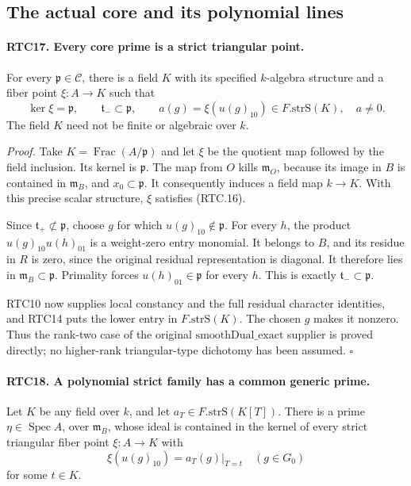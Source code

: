 \subsection{The actual core and its polynomial lines}

\paragraph{RTC17. Every core prime is a strict triangular point.}
\label{claim:RTC17}
For every \(\mathfrak p\in\mathcal C\), there is a field
\(K\) with its specified \(k\)-algebra structure and a fiber
point \(\xi:A\to K\) such that
\[
 \ker\xi=\mathfrak p,\qquad
 \mathfrak t_-\subset\mathfrak p,\qquad
 a(g)=\xi(u(g)_{10})\in F.\mathrm{strS}(K),\quad a\ne0.
                                                        \tag{RTC.29}
\]
The field \(K\) need not be finite or algebraic over \(k\).

\emph{Proof.}
Take \(K=\operatorname{Frac}(A/\mathfrak p)\) and let
\(\xi\) be the quotient map followed by the field inclusion.
Its kernel is \(\mathfrak p\).  The map from \(O\) kills
\(\mathfrak m_O\), because its image in \(B\) is contained
in \(\mathfrak m_B\), and \(x_0\subset\mathfrak p\).
It consequently induces a field map \(k\to K\).  With this
precise scalar structure, \(\xi\) satisfies (RTC.16).

Since \(\mathfrak t_+\not\subset\mathfrak p\), choose
\(g\) for which \(u(g)_{10}\notin\mathfrak p\).
For every \(h\), the product
\(u(g)_{10}u(h)_{01}\) is a weight-zero entry monomial.
It belongs to \(B\), and its residue in \(R\) is zero,
since the original residual representation is diagonal.
It therefore lies in \(\mathfrak m_B\subset\mathfrak p\).
Primality forces \(u(h)_{01}\in\mathfrak p\) for every
\(h\).  This is exactly \(\mathfrak t_-\subset\mathfrak p\).

RTC10 now supplies local constancy and the full residual character
identities, and RTC14 puts the lower entry in
\(F.\mathrm{strS}(K)\).  The chosen \(g\) makes it nonzero.
Thus the rank-two case of the original
\(\mathrm{smoothDual\_exact}\) supplier is proved directly;
no higher-rank triangular-type dichotomy has been assumed.
\hfill\(\square\)

\paragraph{RTC18. A polynomial strict family has a common generic prime.}
\label{claim:RTC18}
Let \(K\) be any field over \(k\), and let
\(a_T\in F.\mathrm{strS}(K[T])\).  There is a prime
\(\eta\in\operatorname{Spec}A\), over \(\mathfrak m_B\),
whose ideal is contained in the kernel of every strict triangular
fiber point \(\xi:A\to K\) with
\[
 \xi(u(g)_{10})=a_T(g)|_{T=t}\quad(g\in G_0)
                                                        \tag{RTC.30}
\]
for some \(t\in K\).

